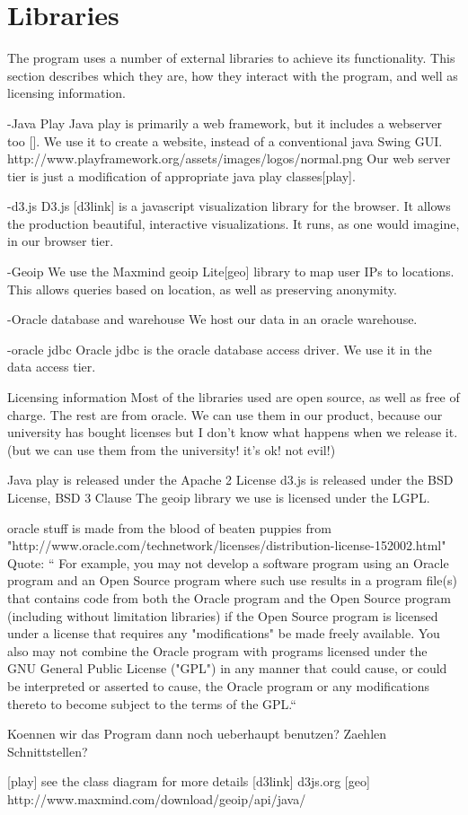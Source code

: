 \section{Libraries}

The program uses a number of external libraries to achieve its functionality. This section describes which they are,
how they interact with the program, and well as licensing information. 

-Java Play
Java play is primarily a web framework, but it includes a webserver too [].
We use it to create a website, instead of a conventional java Swing GUI.
http://www.playframework.org/assets/images/logos/normal.png
Our web server tier is just a modification of appropriate java play classes[play].

-d3.js
D3.js [d3link] is a javascript visualization library for the browser.
It allows the production beautiful, interactive visualizations.
It runs, as one would imagine, in our browser tier.

-Geoip
We use the Maxmind geoip Lite[geo] library to map user IPs to locations.
This allows queries based on location, as well as preserving anonymity.

-Oracle database and warehouse
We host our data in an oracle warehouse.

-oracle jdbc
Oracle jdbc is the oracle database access driver. We use it in the data access tier.



Licensing information
Most of the libraries used are open source, as well as free of charge.
The rest are from oracle. We can use them in our product, because our university has bought licenses but I don't know what happens when we release it.
(but we can use them from the university! it's ok! not evil!)

Java play is released under the Apache 2 License
d3.js is released under the BSD License, BSD 3 Clause
The geoip library we use is licensed under the LGPL.


oracle stuff is made from the blood of beaten puppies
from "http://www.oracle.com/technetwork/licenses/distribution-license-152002.html"
Quote:
`` For example, you may not develop a software program using an Oracle program and an Open Source program where such use results in a program file(s) that contains code from both the Oracle program and the Open Source program (including without limitation libraries) if the Open Source program is licensed under a license that requires any "modifications" be made freely available. You also may not combine the Oracle program with programs licensed under the GNU General Public License ("GPL") in any manner that could cause, or could be interpreted or asserted to cause, the Oracle program or any modifications thereto to become subject to the terms of the GPL.``

Koennen wir das Program dann noch ueberhaupt benutzen? Zaehlen Schnittstellen?





[play] see the class diagram for more details
[d3link] d3js.org
[geo] http://www.maxmind.com/download/geoip/api/java/
